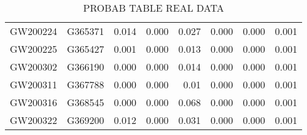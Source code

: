 \begin{table}[]
\begin{tabular}{c|c|ccr|ccr}
GW200224                      & G365371               & 0.014                   & 0.000                    & 0.027                   & 0.000                   & 0.000                    & 0.001                   \\
GW200225                      & G365427               & 0.001                   & 0.000                    & 0.013                   & 0.000                   & 0.000                    & 0.001                   \\
GW200302                      & G366190               & 0.000                   & 0.000                    & 0.014                   & 0.000                   & 0.000                    & 0.001                   \\
GW200311                      & G367788               & 0.000                   & 0.000                    & 0.01                    & 0.000                   & 0.000                    & 0.001                   \\
GW200316                      & G368545               & 0.000                   & 0.000                    & 0.068                   & 0.000                   & 0.000                    & 0.001                   \\
GW200322                      & G369200               & 0.012                   & 0.000                    & 0.031                   & 0.000                   & 0.000                    & 0.001                   \\ \cline{1-1} \cline{3-4} \cline{6-7}
\hline
\end{tabular}
\caption{PROBAB TABLE REAL DATA}
\label{tab:real_data}
\end{table}

